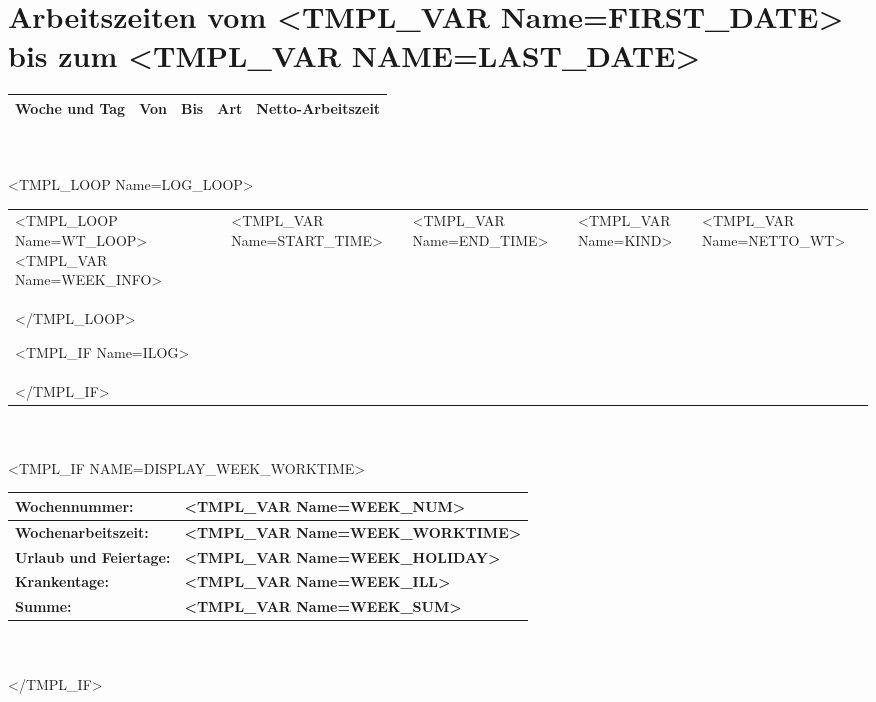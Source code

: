 \documentclass[11pt]{report}
\begin{document}
\setlength{\parindent}{0pt}
\setlength{\parindent}{0pt}
\setlength{\parskip}{1.5ex}



\section*{Arbeitszeiten vom <TMPL_VAR Name=FIRST_DATE> bis zum <TMPL_VAR NAME=LAST_DATE>}

\begin{tabular}{|p{4cm}|p{3.5cm}|p{3.5cm}|p{2cm}|p{2cm}|}
	\hline
	\textbf{Woche und Tag} & 
	\textbf{Von} & 
	\textbf{Bis} & 
	\textbf{Art} & 
	\textbf{Netto-Arbeitszeit} \\
	\hline
\end{tabular}
\\
\\

<TMPL_LOOP Name=LOG_LOOP>

\begin{tabular}{|p{4cm}|p{3.5cm}|p{3.5cm}|p{2cm}|p{2cm}|}
	\hline

	\hline
	<TMPL_LOOP Name=WT_LOOP>
         	<TMPL_VAR Name=WEEK_INFO> & 
	        <TMPL_VAR Name=START_TIME> & 
		<TMPL_VAR Name=END_TIME> & 
		<TMPL_VAR Name=KIND> & 
		<TMPL_VAR Name=NETTO_WT> \\
	</TMPL_LOOP> 

	<TMPL_IF Name=ILOG>
	
	\hline
	\multicolumn{5}{|l|}{ \parbox[b]{15cm}{ 

\small { \texttt{
<TMPL_VAR Name=ILOG> 
} }
 } } \\
	\hline
	</TMPL_IF>
	\hline
\end{tabular}
\\
\\
<TMPL_IF NAME=DISPLAY_WEEK_WORKTIME>
\begin{tabular}{|p{14.3cm}|p{2cm}|}
	\hline
	\textbf{Wochennummer:} & 
	\textbf{<TMPL_VAR Name=WEEK_NUM> } \\
	\hline
	\textbf{Wochenarbeitszeit:} & 
	\textbf{<TMPL_VAR Name=WEEK_WORKTIME> } \\
	\hline
	\textbf{Urlaub und Feiertage:} & 
	\textbf{<TMPL_VAR Name=WEEK_HOLIDAY>} \\
	\hline
	\textbf{Krankentage:} & 
	\textbf{<TMPL_VAR Name=WEEK_ILL> } \\
	\hline
	\textbf{Summe:} & 
	\textbf{<TMPL_VAR Name=WEEK_SUM> } \\
	\hline
\end{tabular}
\\
\\
</TMPL_IF>
\end{document}
